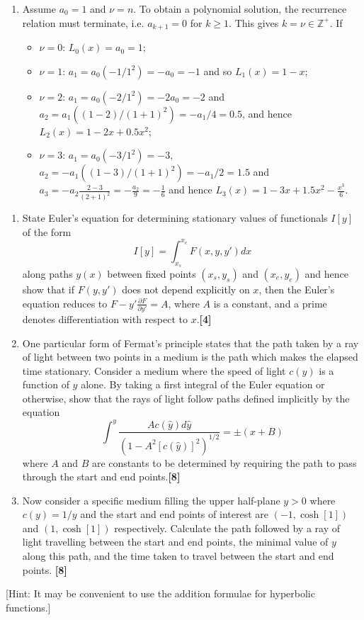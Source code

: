 \documentclass[a4paper]{article}
\begin{document}
\begin{ans}
\begin{enumerate}[label=(\alph*)]
\item Assume $a_0=1$ and $\nu=n$. To obtain a polynomial solution, the recurrence relation must terminate, i.e. $a_{k+1}=0$ for $k\geq1$. This gives $k=\nu\in\mathbb{Z}^+$. If
\begin{itemize}
    \item $\nu=0$: $L_0(x)=a_0=1$;
    \item $\nu=1$: $a_1=a_0(-1/1^2)=-a_0=-1$ and so $L_1(x)=1-x$;
    \item $\nu=2$: $a_1=a_0(-2/1^2)=-2a_0=-2$ and $a_2=a_1((1-2)/(1+1)^2)=-a_1/4=0.5$, and hence $L_2(x)=1-2x+0.5x^2$;
    \item $\nu=3$: $a_1=a_0(-3/1^2)=-3$, $a_2=-a_1((1-3)/(1+1)^2)=-a_1/2=1.5$ and $a_3=-a_2\frac{2-3}{(2+1)^2}=-\frac{a_2}{9}=-\frac{1}{6}$ and hence $L_3(x)=1-3x+1.5x^2-\frac{x^3}{6}$.
\end{itemize}
\end{enumerate}
\end{ans}
\begin{qns}\leavevmode
\begin{enumerate}[label=(\alph*)]
\item  State Euler's equation for determining stationary values of functionals $I[y]$ of the form
$$I[y]=\int_{x_s}^{x_e}F(x,y,y')dx$$
along paths $y(x)$ between fixed points $(x_s,y_s)$ and $(x_e,y_e)$ and hence show that if $F(y,y')$ does not depend explicitly on $x$, then the Euler's equation reduces to $F-y'\frac{\partial F}{\partial y'}=A$, where $A$ is a constant, and a prime denotes differentiation with respect to $x$.\hfill \textbf{[4]}
\item One particular form of Fermat’s principle states that the path taken by a ray of light between two points in a medium is the path which makes the elapsed time stationary. Consider a medium where the speed of light $c(y)$ is a function of $y$ alone. By taking a first integral of the Euler equation or otherwise, show that the rays of light follow paths defined implicitly by the equation
$$\int^y\frac{Ac(\hat{y})d\hat{y}}{(1-A^2[c(\hat{y})]^2)^{1/2}}=\pm(x+B)$$
where $A$ and $B$ are constants to be determined by requiring the path to pass through the start and end points.\hfill \textbf{[8]}
\item Now consider a specific medium filling the upper half-plane $y > 0$ where $c(y) = 1/y$ and the start and end points of interest are $(−1, \cosh[1])$ and $(1, \cosh[1])$ respectively. Calculate the path followed by a ray of light travelling between the start and end points, the minimal value of $y$ along this path, and the time taken to travel between the start and end points. \hfill \textbf{[8]}
\end{enumerate}
[Hint: It may be convenient to use the addition formulae for hyperbolic functions.]
\end{qns}
\end{document}
